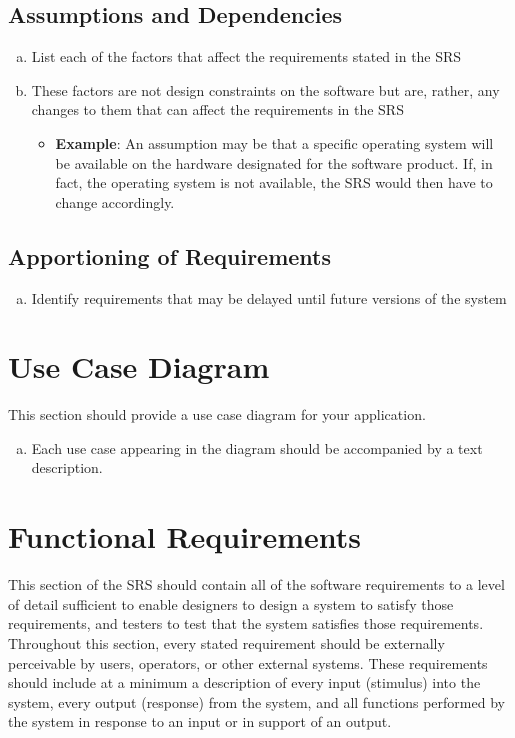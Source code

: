 \documentclass[]{article}
\begin{document}
\subsection{Assumptions and Dependencies}
\label{sub:assumptions_and_dependencies}
\begin{enumerate}[a)]
	\item List each of the factors that affect the requirements stated in the SRS
	\item These factors are not design constraints on the software but are, rather, any changes to them that can affect the requirements in the SRS
	\begin{itemize}
		\item \textbf{Example}: An assumption may be that a specific operating system will be available on the hardware designated for the software product. If, in fact, the operating system is not available, the SRS would then have to change accordingly.
	\end{itemize}
\end{enumerate}

\subsection{Apportioning of Requirements}
\label{sub:apportioning_of_requirements}
\begin{enumerate}[a)]
	\item Identify requirements that may be delayed until future versions of the system
\end{enumerate}


\section{Use Case Diagram}
\label{sec:use_case_diagram}
This section should provide a use case diagram for your application. 
\begin{enumerate}[a)]
	\item Each use case appearing in the diagram should be accompanied by a text description. 
\end{enumerate}

\section{Functional Requirements}
\label{sec:functional_requirements}
This section of the SRS should contain all of the software requirements to a level of detail sufficient to enable designers to design a system to satisfy those requirements, and testers to test that the system satisfies those requirements. Throughout this section, every stated requirement should be externally perceivable by users, operators, or other external systems. These requirements should include at a minimum a description of every input (stimulus) into the system, every output (response) from the system, and all functions performed by the system in response to an input or in support of an output.
\end{document}
